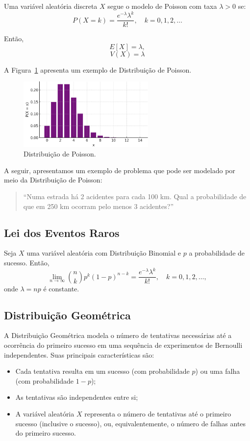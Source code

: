 \documentclass{article}
\begin{document}
Uma variável aleatória discreta $X$ segue o modelo de Poisson com taxa $\lambda > 0$ se:
    $$
    P(X = k) = \frac{e^{-\lambda} \lambda^k}{k!}, \quad k = 0, 1, 2, \ldots
    $$

Então,
    $$
    E[X] = \lambda,
    $$
    $$
    V(X) = \lambda
    $$

A Figura~\ref{fig:dist_disc_poisson} apresenta um exemplo de Distribuição de Poisson.

\begin{figure}[H]
    \centering
    \includegraphics[width=0.6\textwidth]{figuras/dist_disc_poisson.png}
    \caption{Distribuição de Poisson.}
    \label{fig:dist_disc_poisson}
\end{figure}

A seguir, apresentamos um exemplo de problema que pode ser modelado por meio da Distribuição de Poisson:
\begin{quote}
``Numa estrada há 2 acidentes para cada 100 km. Qual a probabilidade de que em 250 km ocorram pelo menos 3 acidentes?''
\end{quote}

\subsection{Lei dos Eventos Raros}
Seja $X$ uma variável aleatória com Distribuição Binomial e $p$ a probabilidade de sucesso. Então,
    $$
    \lim_{n \to \infty} \binom{n}{k} p^k (1 - p)^{n - k} = \frac{e^{-\lambda} \lambda^k}{k!}, \quad k = 0, 1, 2, \ldots,
    $$
onde $\lambda = np$ é constante.

\subsection{Distribuição Geométrica}
A Distribuição Geométrica modela o número de tentativas necessárias até a ocorrência do primeiro sucesso em uma sequência de experimentos de Bernoulli independentes. Suas principais características são:

\begin{itemize}
    \item Cada tentativa resulta em um sucesso (com probabilidade $p$) ou uma falha (com probabilidade $1 - p$);
    \item As tentativas são independentes entre si;
    \item A variável aleatória $X$ representa o número de tentativas até o primeiro sucesso (inclusive o sucesso), ou, equivalentemente, o número de falhas antes do primeiro sucesso.
\end{itemize}
\end{document}
